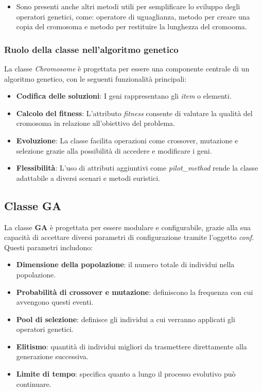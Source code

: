 \begin{itemize}
    \item Sono presenti anche altri metodi utili per semplificare lo sviluppo degli operatori genetici, come: operatore di uguaglianza, metodo per creare una copia del cromosoma e metodo per restituire la lunghezza del cromooma.
\end{itemize}

\subsubsection*{Ruolo della classe nell'algoritmo genetico}

La classe \emph{Chromosome} è progettata per essere una componente centrale di un algoritmo genetico, con le seguenti funzionalità principali:
\begin{itemize}
    \item \textbf{Codifica delle soluzioni}: I geni rappresentano gli \emph{item} o elementi.
    \item \textbf{Calcolo del fitness}: L'attributo \emph{fitness} consente di valutare la qualità del cromosoma in relazione all'obiettivo del problema.
    \item \textbf{Evoluzione}: La classe facilita operazioni come crossover, mutazione e selezione grazie alla possibilità di accedere e modificare i geni.
    \item \textbf{Flessibilità}: L'uso di attributi aggiuntivi come \emph{pilot\_method} rende la classe adattabile a diversi scenari e metodi euristici.
\end{itemize}

\subsection{Classe GA}

La classe \textbf{GA} è progettata per essere modulare e configurabile, grazie alla sua capacità di accettare diversi parametri di configurazione tramite l'oggetto \emph{conf}. Questi parametri includono:
\begin{itemize}
    \item \textbf{Dimensione della popolazione}: il numero totale di individui nella popolazione.
    \item \textbf{Probabilità di crossover e mutazione}: definiscono la frequenza con cui avvengono questi eventi.
    \item \textbf{Pool di selezione}: definisce gli individui a cui verranno applicati gli operatori genetici.
    \item \textbf{Elitismo}: quantità di individui migliori da trasmettere direttamente alla generazione successiva.
    \item \textbf{Limite di tempo}: specifica quanto a lungo il processo evolutivo può continuare.
\end{itemize}

